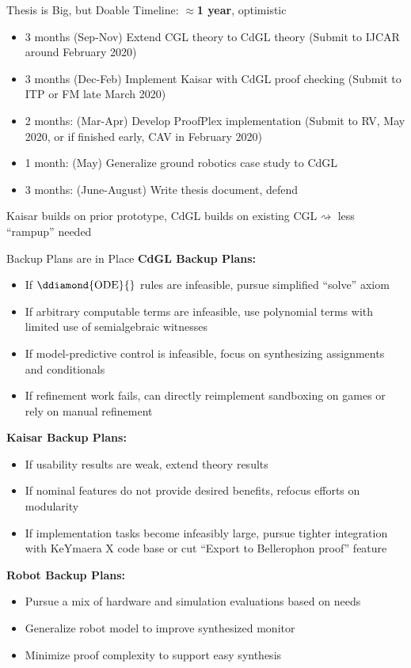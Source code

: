 \documentclass[slidestop,aspectratio=169]{beamer}
\newcommand{\ProofPlex}{ProofPlex\xspace}
\providecommand{\KeYmaeraX}{KeYmaera X\xspace}
\newcommand{\CGL}{CGL\xspace}
\newcommand{\CdGL}{CdGL\xspace}
\theoremstyle{plain}
\theoremstyle{definition}
\theoremstyle{remark}
\begin{document}
\begin{frame}[t]{Thesis is Big, but Doable}
Timeline: $\approx$\textbf{1 year}, optimistic
\begin{itemize}
\item 3 months (Sep-Nov) Extend \CGL theory to \CdGL theory (Submit to IJCAR around February 2020)
\item 3 months (Dec-Feb) Implement Kaisar with \CdGL proof checking (Submit to ITP or FM late March 2020)
\item 2 months: (Mar-Apr) Develop \ProofPlex implementation (Submit to  RV, May 2020, or if finished early, CAV in February 2020)
\item 1 month: (May) Generalize ground robotics case study to \CdGL
\item 3 months: (June-August) Write thesis document, defend
\end{itemize}
Kaisar builds on prior prototype, \CdGL builds on existing \CGL $\rightsquigarrow$ less ``rampup'' needed
\end{frame}

\begin{frame}[t,allowframebreaks]{Backup Plans are in Place}
\textbf{CdGL Backup Plans:}
\begin{itemize}
\item If $\ddiamond{\text{ODE}}{}$ rules are infeasible, pursue simplified ``solve'' axiom
\item If arbitrary computable terms are infeasible, use polynomial terms with limited use of semialgebraic witnesses
\item If model-predictive control is infeasible, focus on synthesizing assignments and conditionals
\item If refinement work fails, can directly reimplement sandboxing on games or rely on manual refinement
\end{itemize}

\textbf{Kaisar Backup Plans:}
\begin{itemize}
\item If usability results are weak, extend theory results
\item If nominal features do not provide desired benefits, refocus efforts on modularity
\item If implementation tasks become infeasibly large, pursue tighter integration with \KeYmaeraX code base or cut ``Export to Bellerophon proof'' feature
\end{itemize}

{\textbf{Robot Backup Plans:}
\begin{itemize}
\item Pursue a mix of hardware and simulation evaluations based on needs
\item Generalize robot model to improve synthesized monitor
\item Minimize proof complexity to support easy synthesis
\end{itemize}}
\end{frame}
\end{document}
